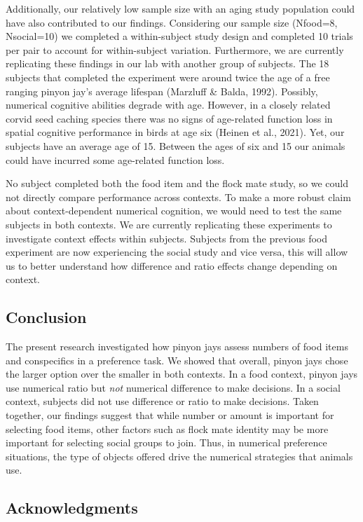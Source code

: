 \documentclass[
  english,
  ,doc,floatsintext]{apa6}
\begin{document}
Additionally, our relatively low sample size with an aging study population could have also contributed to our findings. Considering our sample size (Nfood=8, Nsocial=10) we completed a within-subject study design and completed 10 trials per pair to account for within-subject variation. Furthermore, we are currently replicating these findings in our lab with another group of subjects. The 18 subjects that completed the experiment were around twice the age of a free ranging pinyon jay's average lifespan (Marzluff \& Balda, 1992). Possibly, numerical cognitive abilities degrade with age. However, in a closely related corvid seed caching species there was no signs of age-related function loss in spatial cognitive performance in birds at age six (Heinen et al., 2021). Yet, our subjects have an average age of 15. Between the ages of six and 15 our animals could have incurred some age-related function loss.

No subject completed both the food item and the flock mate study, so we could not directly compare performance across contexts. To make a more robust claim about context-dependent numerical cognition, we would need to test the same subjects in both contexts. We are currently replicating these experiments to investigate context effects within subjects. Subjects from the previous food experiment are now experiencing the social study and vice versa, this will allow us to better understand how difference and ratio effects change depending on context.

\hypertarget{conclusion}{%
\subsection{Conclusion}\label{conclusion}}

The present research investigated how pinyon jays assess numbers of food items and conspecifics in a preference task. We showed that overall, pinyon jays chose the larger option over the smaller in both contexts. In a food context, pinyon jays use numerical ratio but \emph{not} numerical difference to make decisions. In a social context, subjects did not use difference or ratio to make decisions. Taken together, our findings suggest that while number or amount is important for selecting food items, other factors such as flock mate identity may be more important for selecting social groups to join. Thus, in numerical preference situations, the type of objects offered drive the numerical strategies that animals use.

\hypertarget{acknowledgments}{%
\subsection{Acknowledgments}\label{acknowledgments}}
\end{document}
